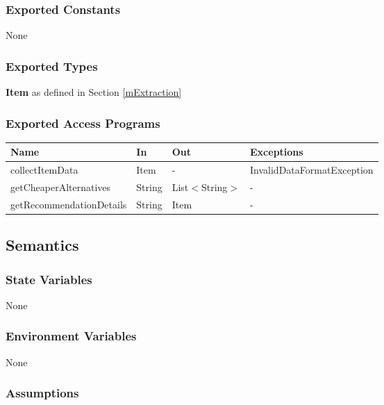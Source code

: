 \documentclass[12pt, titlepage]{article}
\begin{document}
\subsubsection{Exported Constants}

None

\subsubsection{Exported Types}

\textbf{Item} as defined in Section \ref{mExtraction} \\

\subsubsection{Exported Access Programs}

\begin{center}
    \begin{tabular}{p{5cm} p{4cm} p{3cm} p{4cm}}
    \hline
    \textbf{Name} & \textbf{In} & \textbf{Out} & \textbf{Exceptions} \\
    \hline
    collectItemData & Item & - & InvalidDataFormatException \\
    getCheaperAlternatives & String & List$<$String$>$ & - \\
    getRecommendationDetails & String & Item & - \\
    \hline
    \end{tabular}
\end{center}

\subsection{Semantics}

\subsubsection{State Variables}

None

\subsubsection{Environment Variables}

None

\subsubsection{Assumptions}
\end{document}
